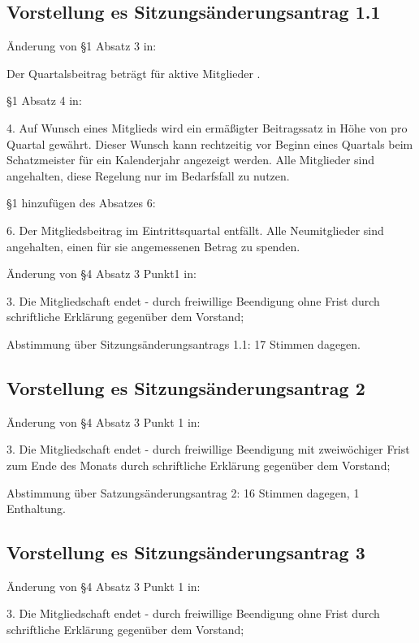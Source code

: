 \documentclass[a4paper,12pt,titlepage]{scrartcl}
\begin{document}
\subsection{Vorstellung es Sitzungsänderungsantrag 1.1}

Änderung von §1 Absatz 3 in:
\begin{displayquote}
Der Quartalsbeitrag beträgt für aktive Mitglieder .
\end{displayquote}
§1 Absatz 4 in:
\begin{displayquote}
4. Auf Wunsch eines Mitglieds wird ein ermäßigter Beitragssatz in Höhe von  pro Quartal gewährt. Dieser Wunsch kann rechtzeitig vor Beginn eines Quartals beim Schatzmeister für ein Kalenderjahr angezeigt werden. Alle Mitglieder sind angehalten, diese Regelung nur im Bedarfsfall zu nutzen.
\end{displayquote}
§1 hinzufügen des Absatzes 6:
\begin{displayquote}
6. Der Mitgliedsbeitrag im Eintrittsquartal entfällt. Alle Neumitglieder sind angehalten, einen für sie angemessenen Betrag zu spenden.
\end{displayquote}
Änderung von §4  Absatz 3 Punkt1 in:
\begin{displayquote}
3. Die Mitgliedschaft endet - durch freiwillige Beendigung ohne Frist durch schriftliche Erklärung gegenüber dem Vorstand;
\end{displayquote}

Abstimmung über Sitzungsänderungsantrags 1.1: 17 Stimmen dagegen.

\subsection{Vorstellung es Sitzungsänderungsantrag 2}

Änderung von §4  Absatz 3 Punkt 1 in:
\begin{displayquote}
3. Die Mitgliedschaft endet
- durch freiwillige Beendigung mit zweiwöchiger Frist zum Ende des Monats durch schriftliche Erklärung gegenüber dem Vorstand;
\end{displayquote}
Abstimmung über Satzungsänderungsantrag 2: 16 Stimmen dagegen, 1 Enthaltung.

\subsection{Vorstellung es Sitzungsänderungsantrag 3}
Änderung von §4  Absatz 3 Punkt 1 in:

\begin{displayquote}
3. Die Mitgliedschaft endet - durch freiwillige Beendigung ohne Frist durch schriftliche Erklärung gegenüber dem Vorstand;
\end{displayquote}
\end{document}
